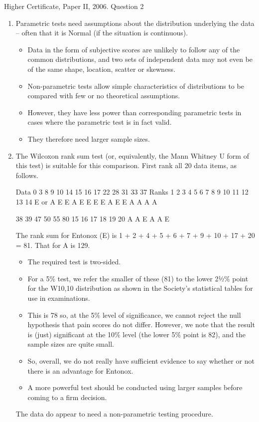 \documentclass[a4paper,12pt]{article}
\begin{document}
Higher Certificate, Paper II, 2006.  Question 2 
 
\begin{enumerate} 
\item Parametric tests need assumptions about the distribution underlying the data  –  often that it is Normal (if the situation is continuous).  
\begin{itemize}
    \item Data in the form of subjective scores are unlikely to follow any of the common distributions, and two sets of independent data may not even be of the same shape, location, scatter or skewness. 
    \item Non-parametric tests allow simple characteristics of distributions to be compared with few or no theoretical assumptions.  
    \item However, they have less power than corresponding parametric tests in cases where the parametric test is in fact valid.  
    \item They therefore need larger sample sizes. 
\end{itemize}
 
 
\item  The Wilcoxon rank sum test (or, equivalently, the Mann Whitney U form of this test) is suitable for this comparison.  First rank all 20 data items, as follows. 
 
Data 0 3 8 9 10 14 15 16 17 22 28 31 33 37 Ranks 1 2 3 4 5 6 7 8 9 10 11 12 13 14 E or A E E A E E E E A E E A A A A 
 
38 39 47 50 55 80 15 16 17 18 19 20 A A E A A E 
 
 
The rank sum for Entonox (E) is 1 + 2 + 4 + 5 + 6 + 7 + 9 + 10 + 17 + 20 = 81.  That for A is 129. 
 
\begin{itemize} 
\item  The required test is two-sided.  
\item For a 5\% test, we refer the smaller of these (81) to the lower 2½\% point for the W10,10 distribution as shown in the Society's statistical tables for use in examinations. 
\item This is 78 so, at the 5\% level of significance, we cannot reject the null hypothesis that pain scores do not differ.  However, we note that the result is (just) significant at the 10\% level (the lower 5\% point is 82), and the sample sizes are quite small.
\item So, overall, we do not really have sufficient evidence to say whether or not there is an advantage for Entonox. 
\item A more powerful test should be conducted using larger samples before coming to a firm decision. 
\end{itemize}
The data do appear to need a non-parametric testing procedure. 
 \end{enumerate}
 
\end{document}
